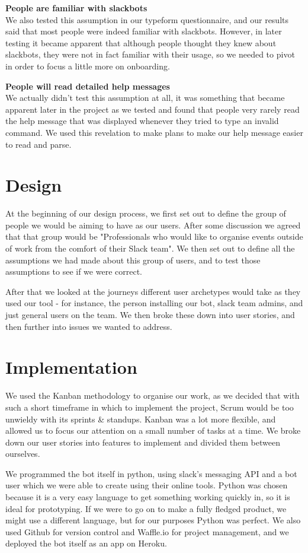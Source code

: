 \documentclass{report}
\begin{document}
\textbf{People are familiar with slackbots}\\
We also tested this assumption in our typeform questionnaire, and our results said that most people were indeed familiar with slackbots. However, in later testing it became apparent that although people thought they knew about slackbots, they were not in fact familiar with their usage, so we needed to pivot in order to focus a little more on onboarding.

\textbf{People will read detailed help messages}\\
We actually didn't test this assumption at all, it was something that became apparent later in the project as we tested and found that people very rarely read the help message that was displayed whenever they tried to type an invalid command. We used this revelation to make plans to make our help message easier to read and parse.

\section{Design}
At the beginning of our design process, we first set out to define the group of people we would be aiming to have as our users. After some discussion we agreed that that group would be "Professionals who would like to organise events outside of work from the comfort of their Slack team". We then set out to define all the assumptions we had made about this group of users, and to test those assumptions to see if we were correct.

After that we looked at the journeys different user archetypes would take as they used our tool - for instance, the person installing our bot, slack team admins, and just general users on the team. We then broke these down into user stories, and then further into issues we wanted to address.

\section{Implementation}
We used the Kanban methodology to organise our work, as we decided that with such a short timeframe in which to implement the project, Scrum would be too unwieldy with its sprints \& standups. Kanban was a lot more flexible, and allowed us to focus our attention on a small number of tasks at a time. We broke down our user stories into features to implement and divided them between ourselves.

We programmed the bot itself in python, using slack's messaging API and a bot user which we were able to create using their online tools. Python was chosen because it is a very easy language to get something working quickly in, so it is ideal for prototyping. If we were to go on to make a fully fledged product, we might use a different language, but for our purposes Python was perfect. We also used Github for version control and Waffle.io for project management, and we deployed the bot itself as an app on Heroku.
\end{document}
